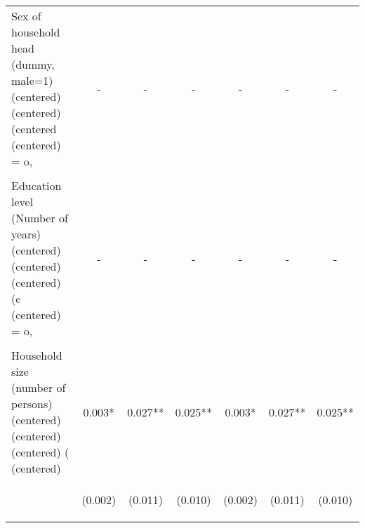 \begin{center}
\begin{tabular}{lcccccc}
Sex of household head (dummy, male=1) (centered) (centered) (centered (centered) = o, & - & - & - & - & - & - \\
\vspace{4pt} & \begin{footnotesize}\end{footnotesize} & \begin{footnotesize}\end{footnotesize} & \begin{footnotesize}\end{footnotesize} & \begin{footnotesize}\end{footnotesize} & \begin{footnotesize}\end{footnotesize} & \begin{footnotesize}\end{footnotesize} \\
Education level (Number of years) (centered) (centered) (centered) (c (centered) = o, & - & - & - & - & - & - \\
\vspace{4pt} & \begin{footnotesize}\end{footnotesize} & \begin{footnotesize}\end{footnotesize} & \begin{footnotesize}\end{footnotesize} & \begin{footnotesize}\end{footnotesize} & \begin{footnotesize}\end{footnotesize} & \begin{footnotesize}\end{footnotesize} \\
Household size (number of persons) (centered) (centered) (centered) ( (centered) & 0.003* & 0.027** & 0.025** & 0.003* & 0.027** & 0.025** \\
\vspace{4pt} & \begin{footnotesize}(0.002)\end{footnotesize} & \begin{footnotesize}(0.011)\end{footnotesize} & \begin{footnotesize}(0.010)\end{footnotesize} & \begin{footnotesize}(0.002)\end{footnotesize} & \begin{footnotesize}(0.011)\end{footnotesize} & \begin{footnotesize}(0.010)\end{footnotesize} \\

\end{tabular}
\end{center}
